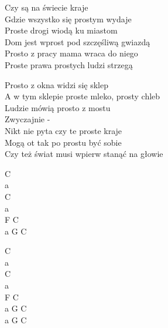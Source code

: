 \begin{text}
    Czy są na świecie kraje\\
    Gdzie wszystko się prostym wydaje\\
    Proste drogi wiodą ku miastom\\
    Dom jest wprost pod szczęśliwą gwiazdą\\
    Prosto z pracy mama wraca do niego\\
    Proste prawa prostych ludzi strzegą

    Prosto z okna widzi się sklep\\
    A w tym sklepie proste mleko, prosty chleb\\
    Ludzie mówią prosto z mostu\\
    Zwyczajnie -\\
    Nikt nie pyta czy te proste kraje\\
    Mogą ot tak po prostu być sobie\\
    Czy też świat musi wpierw stanąć na głowie
\end{text}
\begin{chord}
    C\\
    a\\
    C\\
    a\\
    F C\\
    a G C

    C\\
    a\\
    C\\
    a\\
    F C\\
    a G C\\
    a G C
\end{chord}